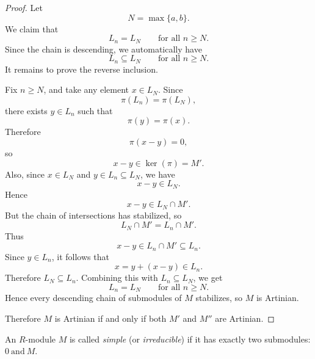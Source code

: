 \begin{proof}
    Let
    \[
        N=\max\{a,b\}.
    \]
    We claim that
    \[
        L_n=L_N
        \qquad\text{for all } n\geq N.
    \]
    Since the chain is descending, we automatically have
    \[
        L_n\subseteq L_N
        \qquad\text{for all } n\geq N.
    \]
    It remains to prove the reverse inclusion.

    Fix $n\geq N$, and take any element $x\in L_N$. Since
    \[
        \pi(L_n)=\pi(L_N),
    \]
    there exists $y\in L_n$ such that
    \[
        \pi(y)=\pi(x).
    \]
    Therefore
    \[
        \pi(x-y)=0,
    \]
    so
    \[
        x-y\in \ker(\pi)=M'.
    \]
    Also, since $x\in L_N$ and $y\in L_n\subseteq L_N$, we have
    \[
        x-y\in L_N.
    \]
    Hence
    \[
        x-y\in L_N\cap M'.
    \]
    But the chain of intersections has stabilized, so
    \[
        L_N\cap M'=L_n\cap M'.
    \]
    Thus
    \[
        x-y\in L_n\cap M'\subseteq L_n.
    \]
    Since $y\in L_n$, it follows that
    \[
        x=y+(x-y)\in L_n.
    \]
    Therefore $L_N\subseteq L_n$. Combining this with $L_n\subseteq L_N$, we get
    \[
        L_n=L_N
        \qquad\text{for all } n\geq N.
    \]
    Hence every descending chain of submodules of $M$ stabilizes, so $M$ is
    Artinian.

    Therefore $M$ is Artinian if and only if both $M'$ and $M''$ are Artinian.
\end{proof}

\begin{definition}
    An $R$-module $M$ is called \emph{simple} (or \emph{irreducible}) if it has exactly two
    submodules: $ 0 \ \text{and} \  M$.
\end{definition}


